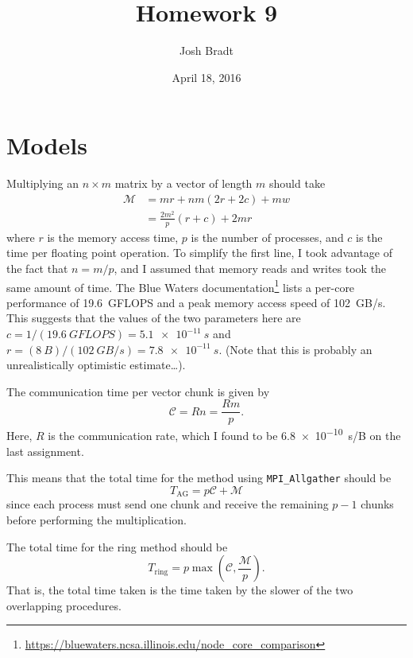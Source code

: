 \documentclass{article}
\title{Homework 9}
\author{Josh Bradt}
\date{April 18, 2016}
\begin{document}
\maketitle

\section{Models}

    Multiplying an $n \times m$ matrix by a vector of length $m$ should take
    \begin{align}
        \mathcal{M} &= mr + nm (2r+2c) + mw \nonumber \\
                    &= \frac{2m^2}{p} (r+c) + 2mr
    \end{align}
    where $r$ is the memory access time, $p$ is the number of processes, and $c$ is the time per floating point operation. To simplify the first line, I took advantage of the fact that $n = m / p$, and I assumed that memory reads and writes took the same amount of time. The Blue Waters documentation\footnote{\url{https://bluewaters.ncsa.illinois.edu/node_core_comparison}} lists a per-core performance of \SI{19.6}{GFLOPS} and a peak memory access speed of \SI{102}{GB/s}. This suggests that the values of the two parameters here are $c = 1 / (\SI{19.6}{GFLOPS}) = \SI{5.1e-11}{s}$ and $r = (\SI{8}{B}) / (\SI{102}{GB/s}) = \SI{7.8e-11}{s}$. (Note that this is probably an unrealistically optimistic estimate\dots).

    The communication time per vector chunk is given by
    \begin{equation}
        \mathcal{C} = R n = \frac{Rm}{p}.
    \end{equation}
    Here, $R$ is the communication rate, which I found to be \SI{6.8e-10}{s/B} on the last assignment.

    This means that the total time for the method using \texttt{MPI\_Allgather} should be
    \begin{equation}
        T_\text{AG} = p \mathcal{C} + \mathcal{M}
    \end{equation}
    since each process must send one chunk and receive the remaining $p-1$ chunks before performing the multiplication.

    The total time for the ring method should be
    \begin{equation}
        T_\text{ring} = p \max\left(\mathcal{C}, \frac{\mathcal{M}}{p}\right).
    \end{equation}
    That is, the total time taken is the time taken by the slower of the two overlapping procedures.
\end{document}
